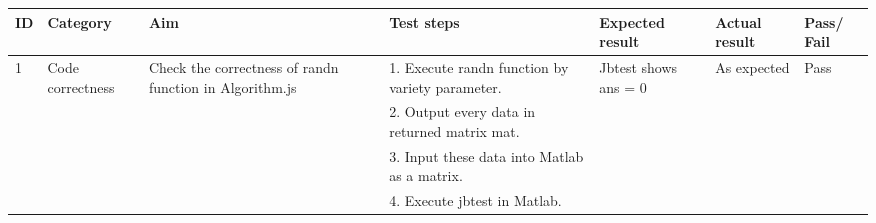 \documentclass{article}
\begin{document}
\begin{longtable}{|p{10pt}|p{60pt}|p{95pt}|p{130pt}|p{60pt}|p{55pt}|p{25pt}|}
\hline
\textbf{ID}         & \textbf{Category}                     & \textbf{Aim}                                                                                                              & \textbf{Test steps}                                                                              & \textbf{Expected result}                                                                               & \textbf{Actual result}                                    & \textbf{Pass/ Fail}    \\ \hline
\endfirsthead
%
\endhead
%
1  & Code correctness     & Check the correctness of randn function in Algorithm.js                                                & 1.    Execute randn function by variety parameter.                                               & Jbtest shows ans = 0                                                                  & {As expected}                              & {Pass} \\ \cline{4-4}
                    &                                       &                                                                                                                           & 2.    Output every data in returned matrix mat.                                                  &                                                                                                        &                                                           &                       \\ \cline{4-4}
                    &                                       &                                                                                                                           & 3.    Input these data into Matlab as a matrix.                                                  &                                                                                                        &                                                           &                       \\ \cline{4-4}
                    &                                       &                                                                                                                           & 4.    Execute jbtest in Matlab.                                                                  &                                                                                                        &                                                           &                       \\ \hline

\end{longtable}
\end{document}
